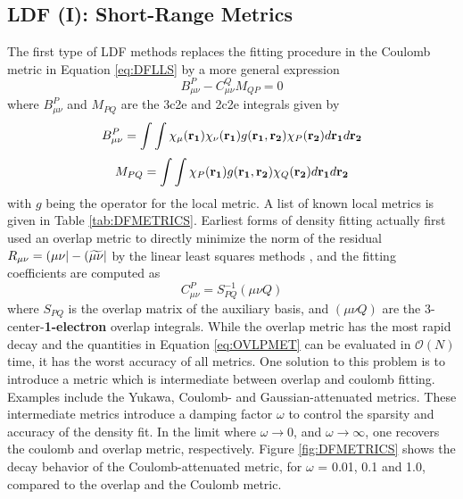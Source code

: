 \subsection{LDF (I): Short-Range Metrics}
The first type of LDF methods replaces the fitting procedure in the Coulomb metric in Equation \ref{eq:DFLLS} by a more general expression
\begin{equation}
B_{\mu\nu}^{P} - C_{\mu\nu}^{Q} M_{QP} = 0
\end{equation}  
\noindent where $B_{\mu\nu}^{P}$ and $M_{PQ}$ are the 3c2e and 2c2e integrals given by
\begin{equation}
B_{\mu\nu}^P = \int\int \chi_{\mu}(\mathbf{r_{1}})\chi_{\nu}(\mathbf{r_{1}}) g(\mathbf{r_1},\mathbf{r_2}) \chi_{P}(\mathbf{r_{2}}) d\mathbf{r_1} d\mathbf{r_2}
\end{equation}
\begin{equation}
M_{PQ} = \int\int \chi_{P}(\mathbf{r_{1}}) g(\mathbf{r_1},\mathbf{r_2}) \chi_{Q}(\mathbf{r_{2}}) d\mathbf{r_1} d\mathbf{r_2}
\end{equation}
\noindent with $g$ being the operator for the local metric. A list of known local metrics is given in Table \ref{tab:DFMETRICS}. Earliest forms of density fitting actually first used an overlap metric to directly minimize the norm of the residual $R_{\mu\nu} = \left( \mu\nu \right\rvert - \left( \widetilde{\mu\nu} \right\rvert$ by the linear least squares methods \cite{Bae1973}, and the fitting coefficients are computed as
\begin{equation}
C^P_{\mu\nu} = S_{PQ}^{-1} (\mu\nu Q)
\label{eq:OVLPMET}
\end{equation}
\noindent where $S_{PQ}$ is the overlap matrix of the auxiliary basis, and $(\mu\nu Q)$ are the 3-center-\textbf{1-electron} overlap integrals. While the overlap metric has the most rapid decay and the quantities in Equation \ref{eq:OVLPMET} can be evaluated in $\mathcal{O}(N)$ time, it has the worst accuracy of all metrics. One solution to this problem is to introduce a metric which is intermediate between overlap and coulomb fitting. Examples include the Yukawa, Coulomb- and Gaussian-attenuated metrics. These intermediate metrics introduce a damping factor $\omega$ to control the sparsity and accuracy of the density fit. In the limit where $\omega \rightarrow 0$, and $\omega \rightarrow \infty$, one recovers the coulomb and overlap metric, respectively. Figure \ref{fig:DFMETRICS} shows the decay behavior of the Coulomb-attenuated metric, for $\omega$ = 0.01, 0.1 and 1.0, compared to the overlap and the Coulomb metric. 

